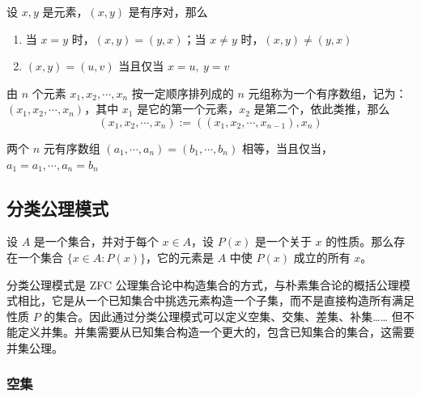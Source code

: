 \begin{proposition}[有序对的性质]
    设 $x,y$ 是元素，$(x,y)$ 是有序对，那么
    \begin{enumerate}
        \item 当 $ x= y $ 时，$ (x,y)=(y,x) $；当 $ x\neq y $ 时，$ (x,y)\neq(y,x) $
        \item $ (x,y)=(u,v) $ 当且仅当 $ x=u,\ y=v $
    \end{enumerate}
\end{proposition}
\vspace{1em}

\begin{definition}
    由 $ n $ 个元素 $ x_1,x_2,\cdots,x_n $ 按一定顺序排列成的 $ n $ 元组称为一个有序数组，记为：$ (x_1,x_2,\cdots,x_n) $，其中 $ x_1 $ 是它的第一个元素，$ x_2 $ 是第二个，依此类推，那么
    \[
        (x_1,x_2,\cdots,x_n) := ((x_1,x_2,\cdots,x_{n-1}),x_n)
    \]
\end{definition}
\vspace{1em}

\begin{proposition}
    两个 $ n $ 元有序数组 $ (a_1,\cdots,a_n)=(b_1,\cdots,b_n) $ 相等，当且仅当，$ a_1=a_1,\cdots,a_n=b_n $
\end{proposition}

\subsection{分类公理模式}

\begin{axiom}
    设 $ A $ 是一个集合，并对于每个 $ x\in A $，设 $ P(x) $ 是一个关于 $ x $ 的性质。那么存在一个集合 $ \{x\in A:P(x)\} $，它的元素是 $ A $ 中使 $ P(x) $ 成立的所有 $x$。
\end{axiom}

\begin{note}
    分类公理模式是 ZFC 公理集合论中构造集合的方式，与朴素集合论的概括公理模式相比，它是从一个已知集合中挑选元素构造一个子集，而不是直接构造所有满足性质 $ P $ 的集合。因此通过分类公理模式可以定义空集、交集、差集、补集…… 但不能定义并集。并集需要从已知集合构造一个更大的，包含已知集合的集合，这需要并集公理。
\end{note}

\subsubsection{空集}

